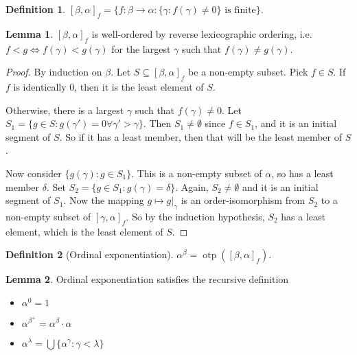 \documentclass[a4paper]{article}
\theoremstyle{definition}
\newtheorem*{defi}{Definition}
\newtheorem*{lemma}{Lemma}
\DeclareMathOperator\otp{otp}
\begin{document}
\begin{defi}
  $[\beta, \alpha]_f = \{f: \beta \to \alpha: \{\gamma: f(\gamma)\not= 0\}\text{ is finite}\}$.
\end{defi}

\begin{lemma}
  $[\beta, \alpha]_f$ is well-ordered by reverse lexicographic ordering, i.e. $f < g\Leftrightarrow f(\gamma) < g(\gamma)$ for the largest $\gamma$ such that $f(\gamma)\not= g(\gamma)$.
\end{lemma}

\begin{proof}
  By induction on $\beta$. Let $S\subseteq [\beta, \alpha]_f$ be a non-empty subset. Pick $f\in S$. If $f$ is identically $0$, then it is the least element of $S$.

  Otherwise, there is a largest $\gamma$ such that $f(\gamma)\not=0$. Let $S_1 = \{g\in S: g(\gamma') = 0 \forall \gamma' > \gamma\}$. Then $S_1\not= \emptyset$ since $f\in S_1$, and it is an initial segment of $S$. So if it has a least member, then that will be the least member of $S$.

  Now consider $\{g(\gamma): g\in S_1\}$. This is a non-empty subset of $\alpha$, so has a least member $\delta$. Set $S_2 = \{g\in S_1: g(\gamma) = \delta\}$. Again, $S_2\not= \emptyset$ and it is an initial segment of $S_1$. Now the mapping $g\mapsto g|_\gamma$ is an order-isomorphism from $S_2$ to a non-empty subset of $[\gamma, \alpha]_f$. So by the induction hypothesis, $S_2$ has a least element, which is the least element of $S$.
\end{proof}

\begin{defi}[Ordinal exponentiation]
  $\alpha^\beta = \otp([\beta, \alpha]_f)$.
\end{defi}

\begin{lemma}
  Ordinal exponentiation satisfies the recursive definition
  \begin{itemize}
  \item $\alpha^0 = 1$
  \item $\alpha^{\beta^+}= \alpha^\beta\cdot\alpha$
  \item $\alpha^\lambda = \bigcup\{\alpha^\gamma: \gamma < \lambda\}$
  \end{itemize}
\end{lemma}
\end{document}
